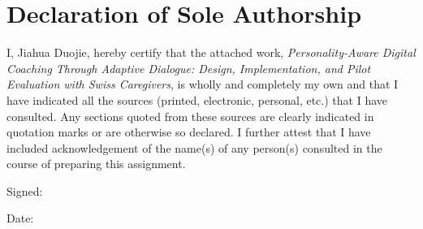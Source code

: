 \documentclass[10pt,a4paper]{report}
\begin{document}
\chapter*{Declaration of Sole Authorship}

I, Jiahua Duojie, hereby certify that the attached work, \emph{Personality-Aware Digital Coaching Through Adaptive Dialogue: Design, Implementation, and Pilot Evaluation with Swiss Caregivers}, is wholly and completely my own and that I have indicated all the sources (printed, electronic, personal, etc.) that I have consulted. Any sections quoted from these sources are clearly indicated in quotation marks or are otherwise so declared. I further attest that I have included acknowledgement of the name(s) of any person(s) consulted in the course of preparing this assignment.

\vspace{2cm}
Signed: \underline{\hspace{5cm}}

Date: \underline{\hspace{5cm}}
\end{document}
